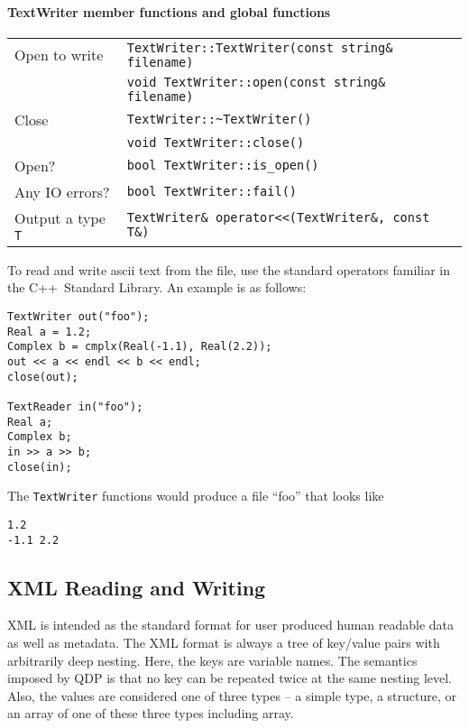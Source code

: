 \documentclass[12pt,letterpaper]{article}
\newcommand{\cpp}{C++}
\begin{document}
\paragraph{TextWriter member functions and global functions}

\begin{flushleft}
  \begin{tabular}{|l|l|}
  \hline
  Open to write  & \verb|TextWriter::TextWriter(const string& filename)|\\
                 & \verb|void TextWriter::open(const string& filename)|\\
  \hline
  Close          & \verb|TextWriter::~TextWriter()|\\
                 & \verb|void TextWriter::close()|\\
  \hline
  Open?          & \verb|bool TextWriter::is_open()| \\
  \hline
  Any IO errors? & \verb|bool TextWriter::fail()| \\
  \hline
  Output a type \verb|T| & \verb|TextWriter& operator<<(TextWriter&, const T&)| \\
  \hline
 \end{tabular}
\end{flushleft}
%
To read and write ascii text from the file, use the standard operators
familiar in the \cpp\ Standard Library. An example is as follows:
%
\begin{small}
\begin{verbatim}
TextWriter out("foo");
Real a = 1.2;
Complex b = cmplx(Real(-1.1), Real(2.2));
out << a << endl << b << endl;
close(out);

TextReader in("foo");
Real a;
Complex b;
in >> a >> b;
close(in);
\end{verbatim}
\end{small}
%
The \verb|TextWriter| functions would produce a file ``foo'' that looks
like
\begin{verbatim}
1.2
-1.1 2.2
\end{verbatim}

\subsection{XML Reading and Writing}
\label{sec:xmlio}

XML is intended as the standard format for user produced human
readable data as well as metadata. The XML format is always a tree of
key/value pairs with arbitrarily deep nesting. Here, the keys are
variable names. The semantics imposed by QDP is that no key can be
repeated twice at the same nesting level. Also, the values are considered
one of three types -- a simple type, a structure, or an array of one of these
three types including array.
\end{document}
